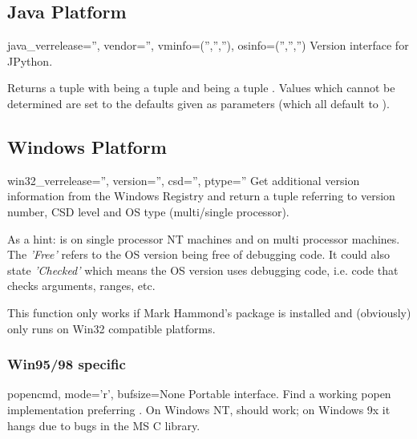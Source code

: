 \subsection{Java Platform}

\begin{funcdesc}{java_ver}{release='', vendor='', vminfo=('','',''),
                           osinfo=('','','')}
  Version interface for JPython.

  Returns a tuple  with  being a tuple  and  being a tuple
  .
  Values which cannot be determined are set to the defaults
  given as parameters (which all default to ).
\end{funcdesc}


\subsection{Windows Platform}

\begin{funcdesc}{win32_ver}{release='', version='', csd='', ptype=''}
  Get additional version information from the Windows Registry
  and return a tuple 
  referring to version number, CSD level and OS type (multi/single
  processor).

  As a hint:  is  on single
  processor NT machines and  on multi
  processor machines. The \emph{'Free'} refers to the OS version being
  free of debugging code. It could also state \emph{'Checked'} which
  means the OS version uses debugging code, i.e. code that
  checks arguments, ranges, etc.

  \begin{notice}[note]
    This function only works if Mark Hammond's 
    package is installed and (obviously) only runs on Win32
    compatible platforms.
  \end{notice}
\end{funcdesc}

\subsubsection{Win95/98 specific}

\begin{funcdesc}{popen}{cmd, mode='r', bufsize=None}
  Portable  interface.  Find a working popen
  implementation preferring .  On Windows
  NT,  should work; on Windows 9x it hangs
  due to bugs in the MS C library.
\end{funcdesc}



